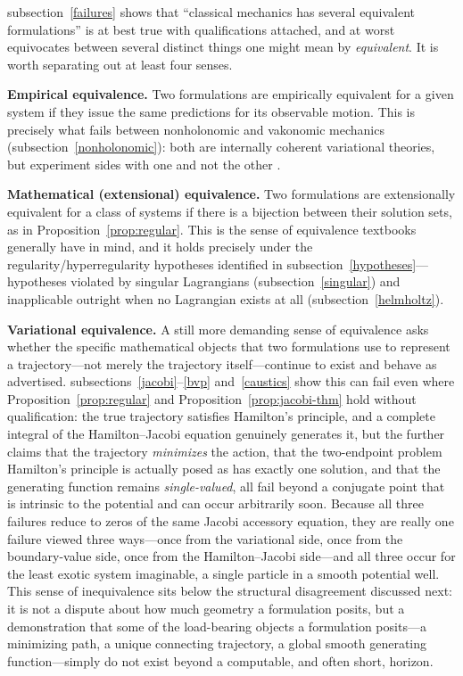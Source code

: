 subsection~\ref{failures} shows that ``classical mechanics has several
equivalent formulations'' is at best true with qualifications attached, and at
worst equivocates between several distinct things one might mean by
\emph{equivalent}. It is worth separating out at least four senses.

\textbf{Empirical equivalence.} Two formulations are empirically equivalent for
a given system if they issue the same predictions for its observable motion.
This is precisely what fails between nonholonomic and vakonomic mechanics
(subsection~\ref{nonholonomic}): both are internally coherent variational
theories, but experiment sides with one and not the other
\cite{lewismurray1995}.

\textbf{Mathematical (extensional) equivalence.} Two formulations are
extensionally equivalent for a class of systems if there is a bijection between
their solution sets, as in Proposition~\ref{prop:regular}. This is the sense of
equivalence textbooks generally have in mind, and it holds precisely under the
regularity/hyperregularity hypotheses identified in
subsection~\ref{hypotheses}---hypotheses violated by singular Lagrangians
(subsection~\ref{singular}) and inapplicable outright when no Lagrangian exists
at all (subsection~\ref{helmholtz}).

\textbf{Variational equivalence.} A still more demanding sense of equivalence
asks whether the specific mathematical objects that two formulations use to
represent a trajectory---not merely the trajectory itself---continue to exist
and behave as advertised. subsections~\ref{jacobi}--\ref{bvp}
and~\ref{caustics} show this can fail even where Proposition~\ref{prop:regular}
and Proposition~\ref{prop:jacobi-thm} hold without qualification: the true
trajectory satisfies Hamilton's principle, and a complete integral of the
Hamilton--Jacobi equation genuinely generates it, but the further claims that
the trajectory \emph{minimizes} the action, that the two-endpoint problem
Hamilton's principle is actually posed as has exactly one solution, and that
the generating function remains \emph{single-valued}, all fail beyond a
conjugate point that is intrinsic to the potential and can occur arbitrarily
soon. Because all three failures reduce to zeros of the same Jacobi accessory
equation, they are really one failure viewed three ways---once from the
variational side, once from the boundary-value side, once from the
Hamilton--Jacobi side---and all three occur for the least exotic system
imaginable, a single particle in a smooth potential well. This sense of
inequivalence sits below the structural disagreement discussed next: it is not
a dispute about how much geometry a formulation posits, but a demonstration
that some of the load-bearing objects a formulation posits---a minimizing path,
a unique connecting trajectory, a global smooth generating function---simply do
not exist beyond a computable, and often short, horizon.


